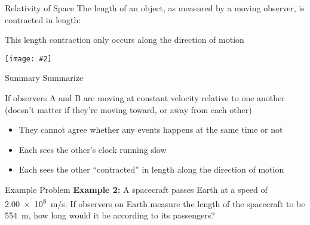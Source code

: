 \documentclass[12pt,compress,aspectratio=169]{beamer}
\newcommand{\pic}[2]{\texttt{[image: \#2]}}
\newcommand{\bigsqrt}{\ensuremath\sqrt{1-\left(\frac{v}{c}\right)^2}}
\newcommand{\lorentz}{\ensuremath\frac{1}{\bigsqrt}}
\newcommand{\eq}[2]{\vspace{#1}{\Large\begin{displaymath}#2\end{displaymath}}}
\begin{document}
\begin{frame}{Relativity of Space}
  The length of an object, as measured by a moving observer, is contracted in
  length:
  
  \eq{-.35in}{
    \boxed{L'=L\bigsqrt=\frac{L}{\gamma}}
  }
  
  This length contraction only occurs along the direction of motion
  \begin{center}
    \pic{.6}{graphics/baseball-contraction.jpg}
    \end{center}
\end{frame}



%
%
%  
%  


\begin{frame}{Summary Summarize}
  \begin{center}
  \end{center}
  If observers A and B are moving at constant velocity relative to one another
  (doesn't matter if they're moving toward, or away from each other)
  \begin{itemize}
  \item They cannot agree whether any events happens at the same time or not
  \item Each sees the other's clock running slow
  \item Each sees the other ``contracted'' in length along the direction of
    motion
  \end{itemize}
\end{frame}

\begin{frame}{Example Problem}
  \textbf{Example 2:} A spacecraft passes Earth at a speed of \SI{2.00e8}{m/s}.
  If observers on Earth measure the length of the spacecraft to be
  \SI{554}{m}, how long would it be according to its passengers?
\end{frame}
\end{document}
